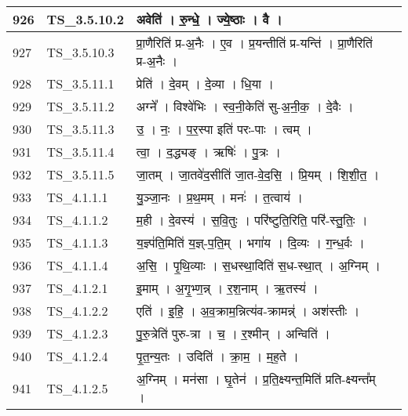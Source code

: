 \documentclass[17pt]{extarticle}
\begin{document}
\begin{longtable}{||p{0.4in}||p{0.9in}||p{4.0in}||p{0.9in}||}
        \hline
            926 & TS\_3.5.10.2 & अवेति॑   ।   रु॒न्धे॒   ।   ज्ये॒ष्ठाः   ।   वै   ।    &      \\
        \hline
            927 & TS\_3.5.10.3 & प्रा॒णैरिति॑ प्र{-}अ॒नैः   ।   ए॒व   ।   प्र॒यन्तीति॑ प्र{-}यन्ति॑   ।   प्रा॒णैरिति॑ प्र{-}अ॒नैः   ।    &      \\
        \hline
            928 & TS\_3.5.11.1 & प्रेति॑   ।   दे॒वम्   ।   दे॒व्या   ।   धि॒या   ।    &      \\
        \hline
            929 & TS\_3.5.11.2 & अग्ने᳚   ।   विश्वे॑भिः   ।   स्व॒नी॒केति॑ सु{-}अ॒नी॒क॒   ।   दे॒वैः   ।    &      \\
        \hline
            930 & TS\_3.5.11.3 & उ॒   ।   नः॒   ।   प॒र॒स्पा इति॑ परः{-}पाः   ।   त्वम्   ।    &      \\
        \hline
            931 & TS\_3.5.11.4 & त्वा॒   ।   द॒द्ध्यङ्   ।   ऋषिः॑   ।   पु॒त्रः   ।    &      \\
        \hline
            932 & TS\_3.5.11.5 & जा॒तम्   ।   जा॒तवे॑द॒सीति॑ जा॒त{-}वे॒द॒सि॒   ।   प्रि॒यम्   ।   शि॒शी॒त॒   ।    &      \\
        \hline
            933 & TS\_4.1.1.1 & यु॒ञ्जा॒नः   ।   प्र॒थ॒मम्   ।   मनः॑   ।   त॒त्वाय॑   ।    &      \\
        \hline
            934 & TS\_4.1.1.2 & म॒ही   ।   दे॒वस्य॑   ।   स॒वि॒तुः   ।   परि॑ष्टुति॒रिति॒ परि॑{-}स्तु॒तिः॒   ।    &      \\
        \hline
            935 & TS\_4.1.1.3 & य॒ज्ञ्प॑ति॒मिति॑ य॒ज्ञ्{-}प॒ति॒म्   ।   भगा॑य   ।   दि॒व्यः   ।   ग॒न्ध॒र्वः   ।    &      \\
        \hline
            936 & TS\_4.1.1.4 & अ॒सि॒   ।   पृ॒थि॒व्याः   ।   स॒धस्था॒दिति॑ स॒ध{-}स्था॒त्   ।   अ॒ग्निम्   ।    &      \\
        \hline
            937 & TS\_4.1.2.1 & इ॒माम्   ।   अ॒गृ॒भ्ण॒न्न्   ।   र॒श॒नाम्   ।   ऋ॒तस्य॑   ।    &      \\
        \hline
            938 & TS\_4.1.2.2 & एति॑   ।   इ॒हि॒   ।   अ॒व॒क्राम॒न्नित्य॑व{-}क्रामन्न्॑   ।   अश॑स्तीः   ।    &      \\
        \hline
            939 & TS\_4.1.2.3 & पु॒रु॒त्रेति॑ पुरु{-}त्रा   ।   च॒   ।   र॒श्मीन्   ।   अन्विति॑   ।    &      \\
        \hline
            940 & TS\_4.1.2.4 & पृ॒त॒न्य॒तः   ।   उदिति॑   ।   क्रा॒म॒   ।   म॒ह॒ते   ।    &      \\
        \hline
            941 & TS\_4.1.2.5 & अ॒ग्निम्   ।   मन॑सा   ।   घृ॒तेन॑   ।   प्र॒ति॒क्ष्यन्त॒मिति॑ प्रति{-}क्ष्यन्त᳚म्   ।    &      \\

\end{longtable}
\end{document}
